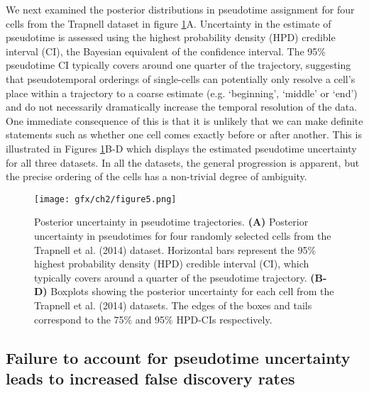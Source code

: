 We next examined the posterior distributions in pseudotime assignment for four cells from the Trapnell dataset in figure \ref{fig:posuncert}A. Uncertainty in the estimate of pseudotime is assessed using the highest probability density (HPD) credible interval (CI), the Bayesian equivalent of the confidence interval. The 95\% pseudotime CI typically covers around one quarter of the trajectory, suggesting that pseudotemporal orderings of single-cells can potentially only resolve a cell's place within a trajectory to a coarse estimate (e.g. `beginning', `middle' or `end') and do not necessarily dramatically increase the temporal resolution of the data. One immediate consequence of this is that it is unlikely that we can make definite statements such as whether one cell comes exactly before or after another. This is illustrated in Figures \ref{fig:posuncert}B-D which displays the estimated pseudotime uncertainty for all three datasets. In all the datasets, the general progression is apparent, but the precise ordering of the cells has a non-trivial degree of ambiguity.

\begin{figure}
\centering
	\texttt{[image: gfx/ch2/figure5.png]}
    \caption{ Posterior uncertainty in pseudotime trajectories.  \textbf{(A)} Posterior uncertainty in pseudotimes for four randomly selected cells from the Trapnell et al. (2014) dataset. Horizontal bars represent the 95\% highest probability density (HPD) credible interval (CI), which typically covers around a quarter of the pseudotime trajectory. \textbf{(B-D)} Boxplots showing the posterior uncertainty for each cell from the Trapnell et al. (2014) datasets. The edges of the boxes and tails correspond to the 75\% and 95\% HPD-CIs respectively.} \label{fig:posuncert}
\end{figure}


\subsection{Failure to account for pseudotime uncertainty leads to increased false discovery rates}

